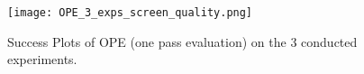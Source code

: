 \documentclass{article}
\begin{document}
\begin{figure}[!h] %
	\centering
	\captionsetup{justification=centering}
	\texttt{[image: OPE\_3\_exps\_screen\_quality.png]}
	\caption{Success Plots of OPE (one pass evaluation) on the 3 conducted experiments.}
	\label{fig-OPEs}
\end{figure}
\end{document}
